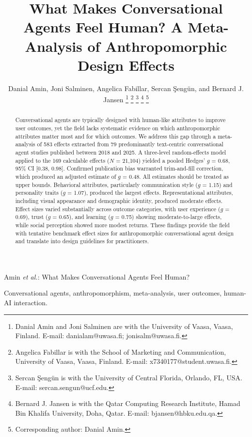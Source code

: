 \documentclass[lettersize,journal]{IEEEtran}
\begin{document}
\title{What Makes Conversational Agents Feel Human? A Meta-Analysis of Anthropomorphic Design Effects}

\author{Danial Amin, Joni Salminen, Angelica Fabillar, Sercan \c{S}eng\"{u}n, and Bernard J. Jansen%
\thanks{Danial Amin and Joni Salminen are with the University of Vaasa, Vaasa, Finland. E-mail: danialam@uwasa.fi; jonisalm@uwasa.fi.}%
\thanks{Angelica Fabillar is with the School of Marketing and Communication, University of Vaasa, Vaasa, Finland. E-mail: x7340177@student.uwasa.fi.}%
\thanks{Sercan \c{S}eng\"{u}n is with the University of Central Florida, Orlando, FL, USA. E-mail: sercan.sengun@ucf.edu.}%
\thanks{Bernard J. Jansen is with the Qatar Computing Research Institute, Hamad Bin Khalifa University, Doha, Qatar. E-mail: bjansen@hbku.edu.qa.}%
\thanks{Corresponding author: Danial Amin.}}

%
{Amin \MakeLowercase{\textit{et al.}}: What Makes Conversational Agents Feel Human?}

\maketitle

\begin{abstract}
Conversational agents are typically designed with human-like attributes to improve user outcomes, yet the field lacks systematic evidence on which anthropomorphic attributes matter most and for which outcomes. We address this gap through a meta-analysis of 583 effects extracted from 79 predominantly text-centric conversational agent studies published between 2018 and 2025. A three-level random-effects model applied to the 169 calculable effects ($N$ = 21,104) yielded a pooled Hedges' $g$ = 0.68, 95\% CI [0.38, 0.98]. Confirmed publication bias warranted trim-and-fill correction, which produced an adjusted estimate of $g$ = 0.48. All estimates should be treated as upper bounds. Behavioral attributes, particularly communication style ($g$ = 1.15) and personality traits ($g$ = 1.07), produced the largest effects. Representational attributes, including visual appearance and demographic identity, produced moderate effects. Effect sizes varied substantially across outcome categories, with user experience ($g$ = 0.69), trust ($g$ = 0.65), and learning ($g$ = 0.75) showing moderate-to-large effects, while social perception showed more modest returns. These findings provide the field with tentative benchmark effect sizes for anthropomorphic conversational agent design and translate into design guidelines for practitioners.
\end{abstract}

\begin{IEEEkeywords}
Conversational agents, anthropomorphism, meta-analysis, user outcomes, human-AI interaction.
\end{IEEEkeywords}
\end{document}
